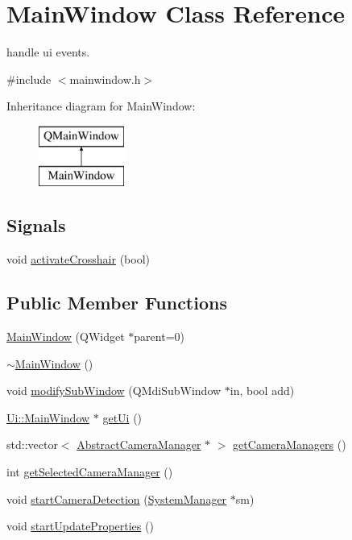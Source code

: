 \hypertarget{class_main_window}{}\section{Main\+Window Class Reference}
\label{class_main_window}


handle ui events.  




{\ttfamily \#include $<$mainwindow.\+h$>$}

Inheritance diagram for Main\+Window\+:\begin{figure}[H]
\begin{center}
\leavevmode
\includegraphics[height=2.000000cm]{class_main_window}
\end{center}
\end{figure}
\subsection*{Signals}
\begin{DoxyCompactItemize}
\item 
void \mbox{\hyperlink{class_main_window_a8aca5460ce992afb3fcba398cc387466}{activate\+Crosshair}} (bool)
\end{DoxyCompactItemize}
\subsection*{Public Member Functions}
\begin{DoxyCompactItemize}
\item 
\mbox{\hyperlink{class_main_window_a8b244be8b7b7db1b08de2a2acb9409db}{Main\+Window}} (Q\+Widget $\ast$parent=0)
\item 
\mbox{\hyperlink{class_main_window_ae98d00a93bc118200eeef9f9bba1dba7}{$\sim$\+Main\+Window}} ()
\item 
void \mbox{\hyperlink{class_main_window_aa1aedeaf20f2f0b571a7bd655e3e819e}{modify\+Sub\+Window}} (Q\+Mdi\+Sub\+Window $\ast$in, bool add)
\item 
\mbox{\hyperlink{class_ui_1_1_main_window}{Ui\+::\+Main\+Window}} $\ast$ \mbox{\hyperlink{class_main_window_a7dede2dbcc623cec02de056df521e96b}{get\+Ui}} ()
\item 
std\+::vector$<$ \mbox{\hyperlink{class_abstract_camera_manager}{Abstract\+Camera\+Manager}} $\ast$ $>$ \mbox{\hyperlink{class_main_window_af6bc85f58060fbcd3ea4b0e6cdc5425a}{get\+Camera\+Managers}} ()
\item 
int \mbox{\hyperlink{class_main_window_adc95f98d2a718dff996a70851f4739f4}{get\+Selected\+Camera\+Manager}} ()
\item 
void \mbox{\hyperlink{class_main_window_a38b8219e5331a62fb73e180533d1a0f0}{start\+Camera\+Detection}} (\mbox{\hyperlink{class_system_manager}{System\+Manager}} $\ast$sm)
\item 
void \mbox{\hyperlink{class_main_window_a8881d72d32283db4867dc254df19ae83}{start\+Update\+Properties}} ()
\end{DoxyCompactItemize}
